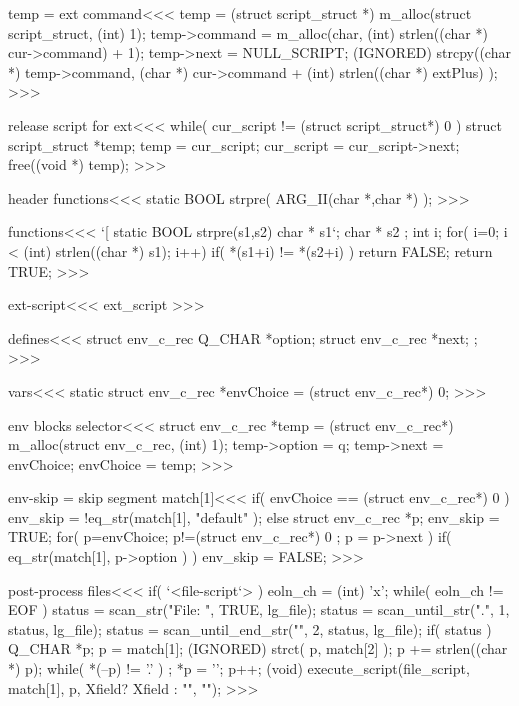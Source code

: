 \<temp = ext command\><<<
temp = (struct script_struct *)
            m_alloc(struct script_struct, (int) 1);
temp->command = m_alloc(char, (int) strlen((char *) cur->command) + 1);
temp->next =  NULL_SCRIPT;
(IGNORED) strcpy((char *) temp->command, 
                 (char *) cur->command + (int) strlen((char *) extPlus) );
>>>

\<release script for ext\><<<
while(  cur_script != (struct script_struct*) 0 ){
                          struct script_struct *temp;
  temp = cur_script; cur_script = cur_script->next; free((void *) temp);  
}
>>>


\<header functions\><<<
static BOOL strpre( ARG_II(char *,char *) );
>>>

\<functions\><<<
`[
static BOOL strpre(s1,s2)  
                    char * s1`;
                    char * s2
;{                   int i;
  for( i=0; i < (int) strlen((char *) s1); i++){
    if( *(s1+i) != *(s2+i) ){ return FALSE; }
  }
  return TRUE;
}
>>>



\<ext-script\><<<
ext_script
>>>



\<defines\><<<
struct env_c_rec{
  Q_CHAR *option;
  struct env_c_rec  *next;
};
>>>

\<vars\><<<
static struct env_c_rec *envChoice
       = (struct env_c_rec*) 0;
>>>


\<env blocks selector\><<<
struct env_c_rec *temp = (struct env_c_rec*)
                   m_alloc(struct env_c_rec, (int) 1);
temp->option = q;
temp->next = envChoice;
envChoice = temp;
>>>

\<env-skip = skip segment match[1]\><<<
if( envChoice == (struct env_c_rec*) 0  ){
  env_skip = !eq_str(match[1], "default" );
} else {
               struct env_c_rec *p;
  env_skip = TRUE;
  for( p=envChoice; p!=(struct env_c_rec*) 0 ; p = p->next ){
    if( eq_str(match[1], p->option ) ){ env_skip = FALSE; }
} }
>>>






\<post-process files\><<<
if( `<file-script`> ){
   eoln_ch = (int) 'x';
   while( eoln_ch != EOF ) {
      status = scan_str("File: ", TRUE, lg_file);
      status = scan_until_str(".", 1, status, lg_file);
      status = scan_until_end_str("", 2, status, lg_file);
      if( status ){                         Q_CHAR *p;
         p = match[1];
         (IGNORED) strct( p, match[2] );
         p += strlen((char *) p);
         while( *(--p) != '.' ){ ; }
         *p = '\0'; p++;
         (void) execute_script(file_script, match[1],
                             p, Xfield? Xfield : "", "");
}  }  }
>>>

